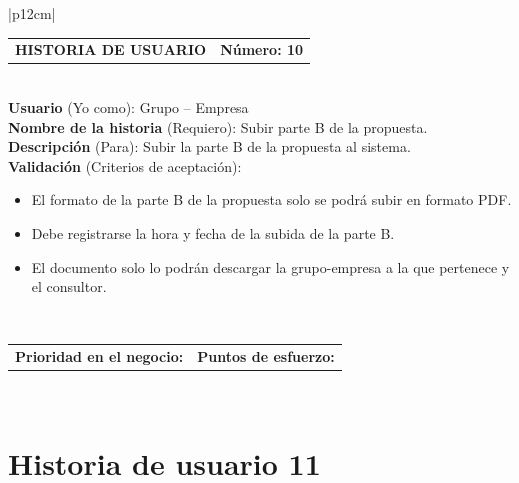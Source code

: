 \documentclass[11pt,letterpaper]{report}
\begin{document}
	\begin{center}	
		\begin{tabular}{|p{12cm}|}
			\hline
			\begin{tabular}{c|c}
				\textbf{HISTORIA DE USUARIO} & \textbf{Número: 10} \\
			\end{tabular} \\ \hline
			\textbf{Usuario} (Yo como): Grupo – Empresa \\ \hline
			\textbf{Nombre de la historia} (Requiero): Subir parte B de la propuesta.  \\ \hline
			\textbf{Descripción} (Para): Subir la parte B de la propuesta al
			sistema. \\ \hline
			\textbf{Validación} (Criterios de aceptación): \\
			\begin{minipage}{12cm}
				\begin{itemize}
					\item El formato de la parte B de la propuesta solo se podrá subir en formato PDF.
					\item Debe registrarse la hora y fecha de la subida de la parte B.
					\item El documento solo lo podrán descargar la grupo-empresa a la que pertenece y el consultor.
				\end{itemize}
			\end{minipage} \\ \hline
			\begin{tabular}{c|c}
				\textbf{Prioridad en el negocio: } & \textbf{Puntos de esfuerzo: } \\
			\end{tabular} \\ \hline
		\end{tabular}
	\end{center}
	
	\section{Historia de usuario 11}
	
\end{document}
